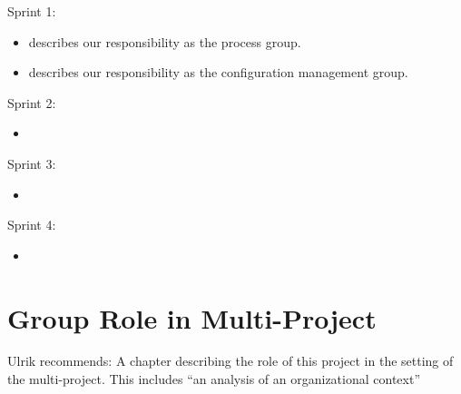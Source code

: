 \begin{documentorganization}
  \item Sprint 1:
  \begin{itemize}
    \item {} describes our responsibility as the process group.
    \item {} describes our responsibility as the configuration management group.
  \end{itemize}
  \item Sprint 2:
  \begin{itemize}
    \item {}
  \end{itemize}
  \item Sprint 3:
  \begin{itemize}
    \item {}
  \end{itemize}
  \item Sprint 4:
  \begin{itemize}
    \item {}
  \end{itemize}
\end{documentorganization}

\section{Group Role in Multi-Project}
Ulrik recommends: A chapter describing the role of this project in the setting of the multi-project. This includes ``an analysis of an organizational context''